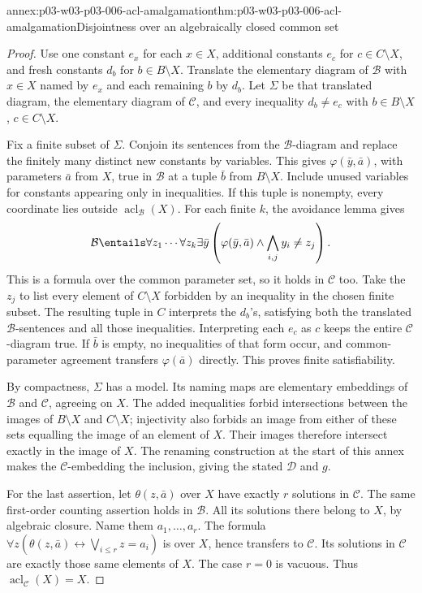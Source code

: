 \begin{annexitem}{annex:p03-w03-p03-006-acl-amalgamation}{thm:p03-w03-p03-006-acl-amalgamation}{Disjointness over an algebraically closed common set}
\begin{proof}
Use one constant \(e_x\) for each \(x\in X\), additional constants
\(e_c\) for \(c\in C\setminus X\), and fresh constants \(d_b\) for
\(b\in B\setminus X\). Translate the elementary diagram of
\(\mathcal B\) with \(x\in X\) named by \(e_x\) and each remaining
\(b\) by \(d_b\). Let \(\Sigma\) be that translated diagram, the
elementary diagram of \(\mathcal C\), and every inequality
\(d_b\neq e_c\) with \(b\in B\setminus X\),
\(c\in C\setminus X\).

Fix a finite subset of \(\Sigma\). Conjoin its sentences from the
\(\mathcal B\)-diagram and replace the finitely many distinct new
constants by variables. This gives \(\varphi(\bar y,\bar a)\), with
parameters \(\bar a\) from \(X\), true in \(\mathcal B\) at a tuple
\(\bar b\) from \(B\setminus X\). Include unused variables for
constants appearing only in inequalities. If this tuple is nonempty,
every coordinate lies outside \(\operatorname{acl}_{\mathcal B}(X)\).
For each finite \(k\), the avoidance lemma gives
\[
 \mathcal B\entails
 \forall z_1\cdots\forall z_k\exists\bar y
 \left(\varphi(\bar y,\bar a)\land
                  \bigwedge_{i,j}y_i\neq z_j\right).
\]
This is a formula over the common parameter set, so it holds in
\(\mathcal C\) too. Take the \(z_j\) to list every element of
\(C\setminus X\) forbidden by an inequality in the chosen finite
subset. The resulting tuple in \(C\) interprets the \(d_b\)'s,
satisfying both the translated \(\mathcal B\)-sentences and all those
inequalities. Interpreting each \(e_c\) as \(c\) keeps the entire
\(\mathcal C\)-diagram true. If \(\bar b\) is empty, no inequalities
of that form occur, and common-parameter agreement transfers
\(\varphi(\bar a)\) directly. This proves finite satisfiability.

By compactness, \(\Sigma\) has a model. Its naming maps are elementary
embeddings of \(\mathcal B\) and \(\mathcal C\), agreeing on \(X\).
The added inequalities forbid intersections between the images of
\(B\setminus X\) and \(C\setminus X\); injectivity also forbids an
image from either of these sets equalling the image of an element of
\(X\). Their images therefore intersect exactly in the image of
\(X\). The renaming construction at the start of this annex makes the
\(\mathcal C\)-embedding the inclusion, giving the stated
\(\mathcal D\) and \(g\).

For the last assertion, let \(\theta(z,\bar a)\) over \(X\) have
exactly \(r\) solutions in \(\mathcal C\). The same first-order
counting assertion holds in \(\mathcal B\). All its solutions there
belong to \(X\), by algebraic closure. Name them \(a_1,\ldots,a_r\).
The formula
\(\forall z(\theta(z,\bar a)\leftrightarrow
\bigvee_{i\leq r}z=a_i)\) is over \(X\), hence transfers to
\(\mathcal C\). Its solutions in \(\mathcal C\) are exactly those
same elements of \(X\). The case \(r=0\) is vacuous. Thus
\(\operatorname{acl}_{\mathcal C}(X)=X\).
\end{proof}
\end{annexitem}
